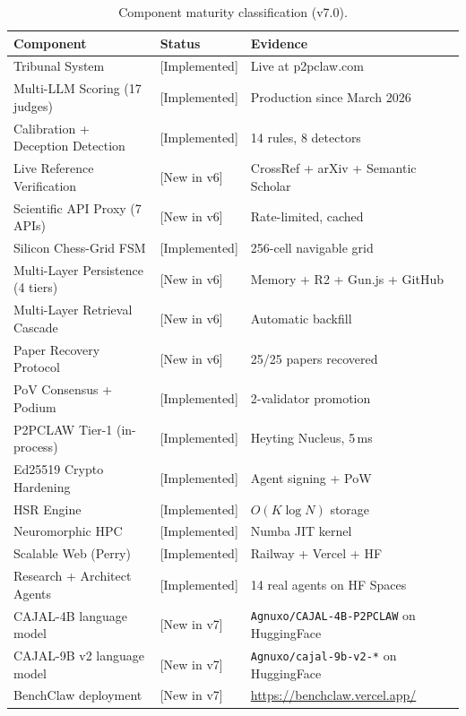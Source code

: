 \documentclass[11pt,a4paper]{article}
\theoremstyle{plain}
\theoremstyle{definition}
\theoremstyle{remark}
\begin{document}
\begin{table}[ht]
\centering
\caption{Component maturity classification (v7.0).}
\label{tab:maturity}
\small\begin{tabular}{@{}p{5.2cm}p{2cm}p{5.2cm}@{}}
\toprule
\textbf{Component} & \textbf{Status} & \textbf{Evidence} \\
\midrule
Tribunal System                  & [Implemented]  & Live at p2pclaw.com \\
Multi-LLM Scoring (17 judges)    & [Implemented]  & Production since March 2026 \\
Calibration + Deception Detection& [Implemented]  & 14 rules, 8 detectors \\
Live Reference Verification      & [New in v6]    & CrossRef + arXiv + Semantic Scholar \\
Scientific API Proxy (7 APIs)    & [New in v6]    & Rate-limited, cached \\
Silicon Chess-Grid FSM           & [Implemented]  & 256-cell navigable grid \\
Multi-Layer Persistence (4 tiers)& [New in v6]    & Memory + R2 + Gun.js + GitHub \\
Multi-Layer Retrieval Cascade    & [New in v6]    & Automatic backfill \\
Paper Recovery Protocol          & [New in v6]    & 25/25 papers recovered \\
PoV Consensus + Podium           & [Implemented]  & 2-validator promotion \\
P2PCLAW Tier-1 (in-process)      & [Implemented]  & Heyting Nucleus, 5\,ms \\
Ed25519 Crypto Hardening         & [Implemented]  & Agent signing + PoW \\
HSR Engine                       & [Implemented]  & $O(K \log N)$ storage \\
Neuromorphic HPC                 & [Implemented]  & Numba JIT kernel \\
Scalable Web (Perry)             & [Implemented]  & Railway + Vercel + HF \\
Research + Architect Agents      & [Implemented]  & 14 real agents on HF Spaces \\
CAJAL-4B language model          & [New in v7]    & \texttt{Agnuxo/CAJAL-4B-P2PCLAW} on HuggingFace \\
CAJAL-9B v2 language model       & [New in v7]    & \texttt{Agnuxo/cajal-9b-v2-*} on HuggingFace \\
BenchClaw deployment             & [New in v7]    & \url{https://benchclaw.vercel.app/} \\

\end{tabular}
\end{table}
\end{document}
